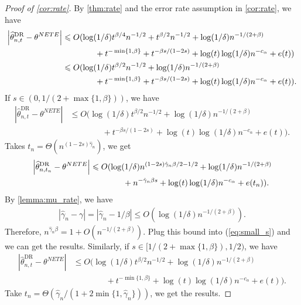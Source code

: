 \documentclass[12pt]{article}
\theoremstyle{plain}
\theoremstyle{definition}
\begin{document}
\begin{proof}[Proof of \cref{cor:rate}]
    By \cref{thm:rate} and the error rate assumption in \cref{cor:rate},  we have
    \begin{align*}
    \left| {{\widehat{\theta }_{n, t}^{\text{DR} }} }   -
    \theta^{NETE} \right|  & \leqslant O (\log(1/\delta) t^{\beta/4}n^{-1/2} + t^{\beta / 2} n^{-1 / 2}+ \log (1 / \delta) n^{- 1 / (2 +\beta)}  \notag\\
    & \quad\quad \quad \quad + t^{- \min \{1, \beta\}}  + t^{- \beta s / (1 - 2 s)} + \log(t)\log(1/\delta) n^{-c_\alpha}+ e (t)) \\
    &\leqslant O (\log(1/\delta) t^{\beta/2}n^{-1/2}+ \log (1 / \delta) n^{- 1 / (2 +\beta)} \\
    & \quad\quad \quad \quad + t^{- \min \{1, \beta\}}  + t^{- \beta s / (1 - 2 s)} + \log(t)\log(1/\delta) n^{-c_\alpha}+ e (t)).
    \end{align*}
    If $s \in (0, 1 / (2 + \max \{1, \beta\}))$, we have 
    \begin{align*}
        \left| {{\widehat{\theta }_{n, t}^{\text{DR} }} }   -
    \theta^{NETE} \right| &\leqslant O (\log(1/\delta) t^{\beta/2}n^{-1/2}+ \log (1 / \delta) n^{- 1 / (2 +\beta)} \\
    &\quad\quad \quad \quad + t^{- \beta s / (1 - 2 s)} + \log(t)\log(1/\delta) n^{-c_\alpha}+ e (t)).
    \end{align*}
    Takes $t_n = \Theta(n^{(1-2s)\hat{\gamma}_n})$, we get
    \begin{align}
        \left| {{\widehat{\theta }_{n, t_n}^{\text{DR} }} }   -
    \theta^{NETE} \right| &\leqslant O (\log(1/\delta) n^{{(1-2s)\hat{\gamma}_n}\beta /2 -1/2}+ \log (1 / \delta) n^{- 1 / (2 +\beta)} \notag\\
    &\quad\quad\quad\quad+ n^{- \hat{\gamma}_n\beta s} + \log(t)\log(1/\delta) n^{-c_\alpha}+ e (t_n)).\label{eq:small_s}
    \end{align}
    By \cref{lemma:mu_rate}, we have 
    \begin{align*}
        |\hat{\gamma}_n - \gamma| = |\hat{\gamma}_n - 1/\beta| \leqslant O(\log(1/\delta)n^{-1/(2+\beta)}). 
    \end{align*}
    Therefore, $ n^{\hat{\gamma}_n \beta} = 1 + O( n^{-1/(2+\beta)}) $. Plug this bound into (\ref{eq:small_s}) and we can get the results. Similarly, if $s \in [ 1 / (2 + \max \{1, \beta\}), 1/2)$, we have 
    \begin{align*}
        \left| {{\widehat{\theta }_{n, t}^{\text{DR} }} }   -
    \theta^{NETE} \right| &\leqslant O (\log(1/\delta) t^{\beta/2}n^{-1/2}+ \log (1 / \delta) n^{- 1 / (2 +\beta)} \\
    &\quad\quad \quad \quad + t^{- \min\{1,\beta\}} + \log(t)\log(1/\delta) n^{-c_\alpha}+ e (t)).
    \end{align*}
    Take $t_n = \Theta(\hat{\gamma}_n / (1 + 2\min\{1, \hat{\gamma}_n\}))$, we get the results. 
\end{proof}
  
\end{document}
